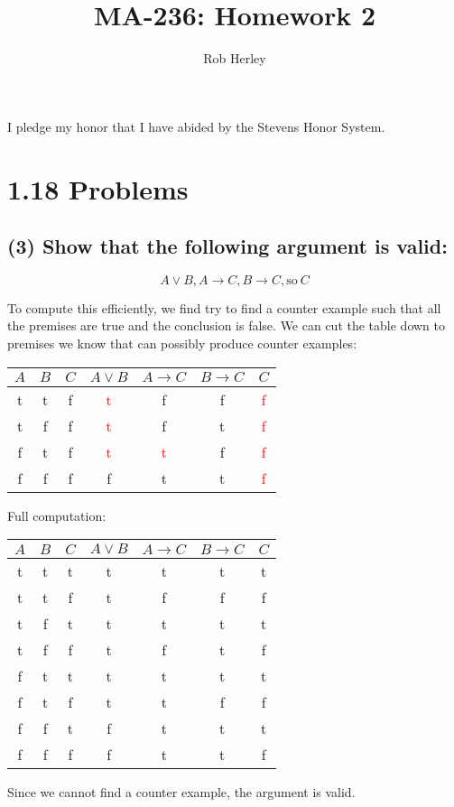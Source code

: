 \documentclass[11pt]{article}
\newcommand{\red}[1]{\textcolor{red}{#1}}
\begin{document}
\title{MA-236: Homework 2}
\author{Rob Herley}
\maketitle

\begin{center}
I pledge my honor that I have abided by the Stevens Honor System.
\end{center}

\section*{1.18 Problems}
\subsection*{(3) Show that the following argument is valid:}
$$A \lor B, A \rightarrow C, B \rightarrow C, \text{so} \ C$$

\noindent
To compute this efficiently, we find try to find a counter example such that all
the premises are true and the conclusion is false. We can cut the table down to
premises we know that can possibly produce counter examples:
\begin{center}
\begin{tabular}{ccc|ccc|c}
$A$ & $B$ & $C$ & $A \lor B$ & $A \rightarrow C$ & $B \rightarrow C$ & $C$ \\ \hline
t & t & f &   \red{t}  & f       &  f  & \red{f} \\
t & f & f &   \red{t}  & f       &  t  & \red{f} \\
f & t & f &   \red{t}  & \red{t} &  f  & \red{f} \\
f & f & f &   f        &   t     &  t  & \red{f}
\end{tabular}
\end{center}

\noindent
Full computation:
\begin{center}
\begin{tabular}{ccc|ccc|c}
$A$ & $B$ & $C$ & $A \lor B$ & $A \rightarrow C$ & $B \rightarrow C$ & $C$ \\ \hline
t & t & t & t & t & t & t \\
t & t & f & t & f & f & f \\
t & f & t & t & t & t & t \\
t & f & f & t & f & t & f \\
f & t & t & t & t & t & t \\
f & t & f & t & t & f & f \\
f & f & t & f & t & t & t \\
f & f & f & f & t & t & f
\end{tabular}
\end{center}

\noindent
Since we cannot find a counter example, the argument is valid.
\end{document}
